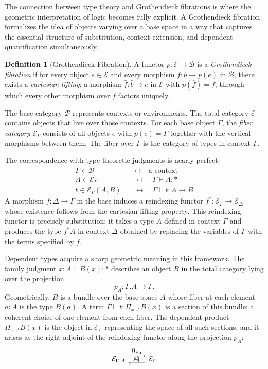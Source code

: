 \documentclass[12pt,a4paper]{article}
\theoremstyle{plain}
\theoremstyle{definition}
\newtheorem{definition}[theorem]{Definition}
\newcommand{\E}{\mathcal{E}}
\newcommand{\B}{\mathcal{B}}
\begin{document}
The connection between type theory and Grothendieck fibrations is where the geometric interpretation of logic becomes fully explicit. A Grothendieck fibration formalizes the idea of objects varying over a base space in a way that captures the essential structure of substitution, context extension, and dependent quantification simultaneously.

\begin{definition}[Grothendieck Fibration]
A functor $p : \E \to \B$ is a \emph{Grothendieck fibration} if for every object $e \in \E$ and every morphism $f : b \to p(e)$ in $\B$, there exists a \emph{cartesian lifting}: a morphism $\bar f : \bar b \to e$ in $\E$ with $p(\bar f) = f$, through which every other morphism over $f$ factors uniquely.
\end{definition}

The base category $\B$ represents contexts or environments. The total category $\E$ contains objects that live over those contexts. For each base object $\Gamma$, the \emph{fiber category} $\E_\Gamma$ consists of all objects $e$ with $p(e) = \Gamma$ together with the vertical morphisms between them. The fiber over $\Gamma$ is the category of types in context $\Gamma$.

The correspondence with type-theoretic judgments is nearly perfect:
\begin{align*}
\Gamma \in \B \quad &\longleftrightarrow \quad \text{a context} \\
A \in \E_\Gamma \quad &\longleftrightarrow \quad \Gamma \vdash A : * \\
t \in \E_\Gamma(A, B) \quad &\longleftrightarrow \quad \Gamma \vdash t : A \to B
\end{align*}
A morphism $f : \Delta \to \Gamma$ in the base induces a reindexing functor $f^* : \E_\Gamma \to \E_\Delta$ whose existence follows from the cartesian lifting property. This reindexing functor is precisely substitution: it takes a type $A$ defined in context $\Gamma$ and produces the type $f^* A$ in context $\Delta$ obtained by replacing the variables of $\Gamma$ with the terms specified by $f$.

Dependent types acquire a sharp geometric meaning in this framework. The family judgment $x : A \vdash B(x) : *$ describes an object $B$ in the total category lying over the projection
\[
p_A : \Gamma.A \to \Gamma.
\]
Geometrically, $B$ is a bundle over the base space $A$ whose fiber at each element $a : A$ is the type $B(a)$. A term $\Gamma \vdash t : \Pi_{x:A} B(x)$ is a section of this bundle: a coherent choice of one element from each fiber. The dependent product $\Pi_{x:A} B(x)$ is the object in $\E_\Gamma$ representing the space of all such sections, and it arises as the right adjoint of the reindexing functor along the projection $p_A$:
\[
\begin{tikzcd}
\E_{\Gamma.A} \arrow[r, shift left=2, "\Pi_{p_A}"] & \E_\Gamma \arrow[l, shift left=2, "p_A^*"'] \arrow[l, phantom, "\dashv"]
\end{tikzcd}
\]
\end{document}
